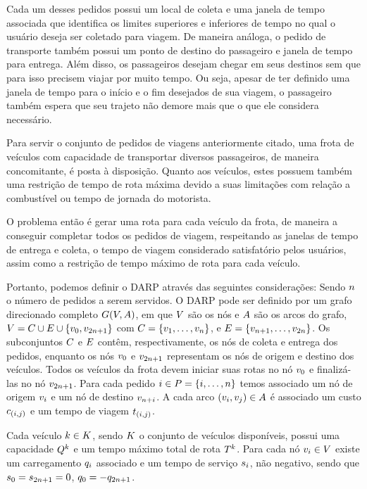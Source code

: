 Cada um desses pedidos possui um local de coleta e uma janela de
tempo associada que identifica os limites superiores e inferiores de tempo no 
qual o usuário deseja ser coletado para viagem.
De maneira análoga, o pedido de transporte também possui um ponto de destino do
passageiro e janela de tempo para entrega.
Além disso, os passageiros desejam chegar em seus destinos sem que para isso
precisem viajar por muito tempo.
Ou seja, apesar de ter definido uma janela de tempo para o início e o fim
desejados de sua viagem, o passageiro também espera que seu trajeto não demore
mais que o que ele considera necessário.

Para servir o conjunto de pedidos de viagens anteriormente citado, uma frota de
veículos com capacidade de transportar diversos passageiros, de maneira
concomitante, é posta à disposição.
Quanto aos veículos, estes possuem também uma restrição de tempo de rota máxima
devido a suas limitações com relação a combustível ou tempo de jornada do
motorista.

O problema então é gerar uma rota para cada veículo da frota, de maneira a
conseguir completar todos os pedidos de viagem, respeitando as janelas de tempo
de entrega e coleta, o tempo de viagem considerado satisfatório
pelos usuários, assim como a restrição de tempo máximo de rota para cada
veículo.

Portanto, podemos definir o DARP através das seguintes considerações:
Sendo $n$ o número de pedidos a serem servidos.
O DARP pode ser definido por um grafo direcionado completo 
$G(V,A)$, em que $V$ são os nós e $A$ são os arcos do
grafo, 
$V = C \cup E \cup \{v_{0}, v_{2n + 1} \}$ com
$C = \{v_{1}, \ldots, v_{n}\}$, e 
$E = \{v_{n + 1}, \ldots,
v_{2n}\}$.
Os subconjuntos $C$ e $E$ contêm, respectivamente, 
os nós de coleta e entrega dos pedidos, enquanto os nós $v_{0}$ e 
$v_{2n + 1}$ representam os nós de origem e destino dos veículos.
Todos os veículos da frota devem iniciar suas rotas no nó $v_{0}$ e
finalizá-las no nó $v_{2n + 1}$.
Para cada pedido $i \in P = \{i, \ldots,
n\}$ temos associado um nó de origem $v_{i}$ e um 
nó de destino $v_{n + i}$.
A cada arco $(v_{i},v_{j}) \in A$ é associado um custo $c_{(i,j)}$ 
e um tempo de viagem $t_{(i,j)}$.

Cada veículo $k \in K$, sendo $K$ o conjunto de 
veículos disponíveis, possui uma capacidade $Q^{k}$ e um tempo 
máximo total de rota $T^k$.
Para cada nó $v_{i} \in V$ existe um carregamento $q_{i}$ 
associado e um tempo de serviço $s_{i}$, não negativo, sendo que 
$s_{0} = s_{2n + 1} = 0$, 
$q_{0} = -q_{2n + 1}$. 

